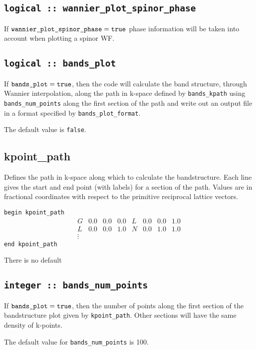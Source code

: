 \subsection[wannier\_plot\_spinor\_phase]{\tt logical ::   wannier\_plot\_spinor\_phase}
If $\verb#wannier_plot_spinor_phase#=\verb#true#$ phase information will
be taken into account when plotting a spinor WF.

\subsection[bands\_plot]{\tt logical :: bands\_plot}

If $\verb#bands_plot#=\verb#true#$, then the code will calculate the band
structure, through Wannier interpolation,
 along
the path in k-space defined by \verb#bands_kpath# using \verb#bands_num_points# along the first
section of the path and write out an output file in a format specified
by \verb#bands_plot_format#.

The default value is \verb#false#.


\subsection[kpoint\_path]{kpoint\_path}
Defines the path in k-space along which to calculate the
bandstructure. Each line gives the start and end point (with labels)
for a section of the path. Values are in fractional coordinates with
respect to the primitive reciprocal lattice vectors.

\noindent  \verb#begin kpoint_path#
$$
\begin{array}{cccccccc}
G & 0.0 & 0.0 & 0.0 & L & 0.0 & 0.0 & 1.0 \\
L & 0.0 & 0.0 & 1.0 & N & 0.0 & 1.0 & 1.0 \\
\vdots
\end{array}
$$
\verb#end kpoint_path#


There is no default

\subsection[bands\_num\_points]{\tt integer :: bands\_num\_points}

If $\verb#bands_plot#=\verb#true#$, then the number of points along
the first section of the bandstructure plot given by
\verb#kpoint_path#. Other sections will have the same density of
k-points.

The default value for \verb#bands_num_points# is 100.


